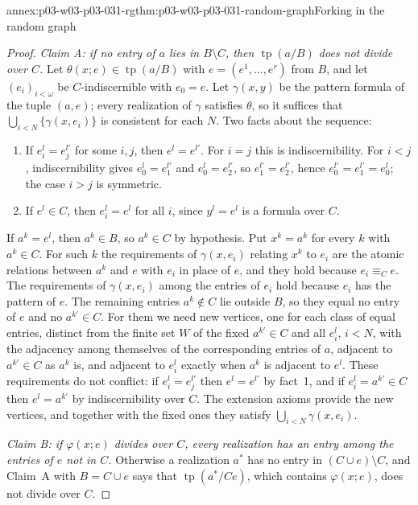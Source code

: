 \begin{annexitem}{annex:p03-w03-p03-031-rg}{thm:p03-w03-p03-031-random-graph}{Forking in the random graph}
\begin{proof}
\emph{Claim A: if no entry of \(a\) lies in \(B\setminus C\), then
\(\operatorname{tp}(a/B)\) does not divide over \(C\).}  Let
\(\theta(x;e)\in\operatorname{tp}(a/B)\) with
\(e=(e^1,\ldots,e^r)\) from \(B\), and let \((e_i)_{i<\omega}\) be
\(C\)-indiscernible with \(e_0=e\).  Let \(\gamma(x,y)\) be the pattern
formula of the tuple \((a,e)\); every realization of \(\gamma\) satisfies
\(\theta\), so it suffices that \(\bigcup_{i<N}\{\gamma(x,e_i)\}\) is
consistent for each \(N\).  Two facts about the sequence:
\begin{enumerate}
  \item If \(e_i^l=e_j^{l'}\) for some \(i,j\), then \(e^l=e^{l'}\).  For
        \(i=j\) this is indiscernibility.  For \(i<j\), indiscernibility
        gives \(e_0^l=e_1^{l'}\) and \(e_0^l=e_2^{l'}\), so
        \(e_1^{l'}=e_2^{l'}\), hence \(e_0^{l'}=e_1^{l'}=e_0^l\); the case
        \(i>j\) is symmetric.
  \item If \(e^l\in C\), then \(e_i^l=e^l\) for all \(i\), since
        \(y^l=e^l\) is a formula over \(C\).
\end{enumerate}
If \(a^k=e^l\), then \(a^k\in B\), so \(a^k\in C\) by hypothesis.  Put
\(x^k=a^k\) for every \(k\) with \(a^k\in C\).  For such \(k\) the
requirements of \(\gamma(x,e_i)\) relating \(x^k\) to \(e_i\) are the
atomic relations between \(a^k\) and \(e\) with \(e_i\) in place of \(e\),
and they hold because \(e_i\equiv_Ce\).  The requirements of
\(\gamma(x,e_i)\) among the entries of \(e_i\) hold because \(e_i\) has the
pattern of \(e\).  The remaining entries \(a^k\notin C\) lie outside
\(B\), so they equal no entry of \(e\) and no \(a^{k'}\in C\).  For them
we need new vertices, one for each class of equal entries, distinct from
the finite set \(W\) of the fixed \(a^{k'}\in C\) and all \(e_i^l\),
\(i<N\), with the adjacency among themselves of the corresponding entries
of \(a\), adjacent to \(a^{k'}\in C\) as \(a^k\) is, and adjacent to
\(e_i^l\) exactly when \(a^k\) is adjacent to \(e^l\).  These requirements
do not conflict: if \(e_i^l=e_j^{l'}\) then \(e^l=e^{l'}\) by fact~1, and
if \(e_i^l=a^{k'}\in C\) then \(e^l=a^{k'}\) by indiscernibility over
\(C\).  The extension axioms provide the new vertices, and together with
the fixed ones they satisfy \(\bigcup_{i<N}\gamma(x,e_i)\).

\emph{Claim B: if \(\varphi(x;e)\) divides over \(C\), every realization
has an entry among the entries of \(e\) not in \(C\).}  Otherwise a
realization \(a^*\) has no entry in \((C\cup e)\setminus C\), and Claim~A
with \(B=C\cup e\) says that \(\operatorname{tp}(a^*/Ce)\), which contains
\(\varphi(x;e)\), does not divide over \(C\).


\end{proof}
\end{annexitem}
